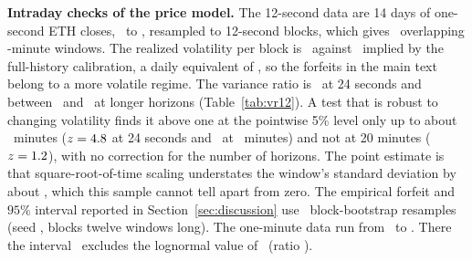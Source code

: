 \documentclass[11pt]{article}
\begin{document}
\textbf{Intraday checks of the price model.} The 12-second data are 14 days of one-second ETH closes, \TwFrom\ to \TwTo, resampled to 12-second blocks, which gives \TwN\ overlapping \EmpWindow-minute windows. The realized volatility per block is \TwSigmaStep\ against \TwImpliedStep\ implied by the full-history calibration, a daily equivalent of \TwDailyEq, so the forfeits in the main text belong to a more volatile regime. The variance ratio is \TwVRTwo\ at 24 seconds and between \TwVRLow\ and \TwVRHigh\ at longer horizons (Table~\ref{tab:vr12}). A test that is robust to changing volatility finds it above one at the pointwise 5\% level only up to about \TwSigMinutes\ minutes ($z=4.8$ at 24 seconds and \TwZRobSig\ at \TwSigMinutes\ minutes) and not at 20 minutes ($z=1.2$), with no correction for the number of horizons. The point estimate is that square-root-of-time scaling understates the window's standard deviation by about \TwUnderstate, which this sample cannot tell apart from zero. The empirical forfeit and $95\%$ interval reported in Section~\ref{sec:discussion} use \TwNBoot\ block-bootstrap resamples (seed \TwSeed, blocks twelve windows long). The one-minute data run from \EmpFrom\ to \EmpTo. There the interval \EmpCI\ excludes the lognormal value of \EmpLognormal\ (ratio \EmpRatio).
\end{document}
